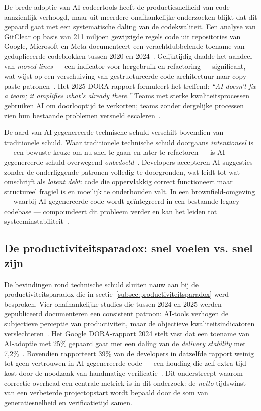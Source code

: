 De brede adoptie van AI-codeertools heeft de productiesnelheid van code aanzienlijk verhoogd, maar uit meerdere onafhankelijke onderzoeken blijkt dat dit gepaard gaat met een systematische daling van de codekwaliteit. Een analyse van GitClear op basis van 211 miljoen gewijzigde regels code uit repositories van Google, Microsoft en Meta documenteert een verachtdubbelende toename van gedupliceerde codeblokken tussen 2020 en 2024~\autocite{LeadDev2025}. Gelijktijdig daalde het aandeel van \textit{moved lines} --- een indicator voor hergebruik en refactoring --- significant, wat wijst op een verschuiving van gestructureerde code-architectuur naar copy-paste-patronen~\autocite{Cerfacs2025}. Het 2025 DORA-rapport formuleert het treffend: \textit{``AI doesn't fix a team; it amplifies what's already there.''} Teams met sterke kwaliteitsprocessen gebruiken AI om doorlooptijd te verkorten; teams zonder dergelijke processen zien hun bestaande problemen versneld escaleren~\autocite{SoftwareSeni2025}.

De aard van AI-gegenereerde technische schuld verschilt bovendien van traditionele schuld. Waar traditionele technische schuld doorgaans \textit{intentioneel} is --- een bewuste keuze om nu snel te gaan en later te refactoren --- is AI-gegenereerde schuld overwegend \textit{onbedoeld}~\autocite{HiddenCosts2025}. Developers accepteren AI-suggesties zonder de onderliggende patronen volledig te doorgronden, wat leidt tot wat \textcite{SoftwareSeni2025} omschrijft als \textit{latent debt}: code die oppervlakkig correct functioneert maar structureel fragiel is en moeilijk te onderhouden valt. In een brownfield-omgeving --- waarbij AI-gegenereerde code wordt geïntegreerd in een bestaande legacy-codebase --- compoundeert dit probleem verder en kan het leiden tot systeeminstabiliteit~\autocite{HiddenCosts2025}.

\subsection{De productiviteitsparadox: snel voelen vs. snel zijn}
\label{subsec:paradox-schuld}

De bevindingen rond technische schuld sluiten nauw aan bij de productiviteitsparadox die in sectie~\ref{subsec:productiviteitsparadox} werd besproken. Vier onafhankelijke studies die tussen 2024 en 2025 werden gepubliceerd documenteren een consistent patroon: AI-tools verhogen de subjectieve perceptie van productiviteit, maar de objectieve kwaliteitsindicatoren verslechteren~\autocite{ByteIota2026}. Het Google DORA-rapport 2024 stelt vast dat een toename van AI-adoptie met 25\% gepaard gaat met een daling van de \textit{delivery stability} met 7,2\%~\autocite{ByteIota2026}. Bovendien rapporteert 39\% van de developers in datzelfde rapport weinig tot geen vertrouwen in AI-gegenereerde code --- een houding die zelf extra tijd kost door de noodzaak van handmatige verificatie~\autocite{ByteIota2026}. Dit onderstreept waarom correctie-overhead een centrale metriek is in dit onderzoek: de \textit{netto} tijdswinst van een verbeterde projectopstart wordt bepaald door de som van generatiesnelheid en verificatietijd samen.

